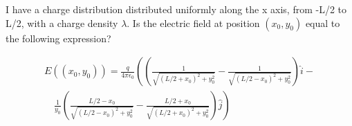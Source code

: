 \documentclass[12pt]{article}
\begin{document}
I have a charge distribution distributed uniformly along the x axis, from -L/2
to L/2, with a charge density $\lambda$. Is the electric field at position
$(x_0,y_0)$ equal to the following expression?

\begin{align*}
    E((x_0,y_0))=\frac{q}{4\pi\epsilon_0}\left(\left(\frac{1}{\sqrt{(L/2+x_0)^2+y_0^2}}-\frac{1}{\sqrt{(L/2-x_0)^2+y_0^2}}\right)\hat{i}-\right.\\
                                               \quad\left.\frac{1}{y_0}\left(\frac{L/2-x_0}{\sqrt{(L/2-x_0)^2+y_0^2}}-\frac{L/2+x_0}{\sqrt{(L/2+x_0)^2+y_0^2}}\right)\hat{j}\right)
\end{align*}
\end{document}
